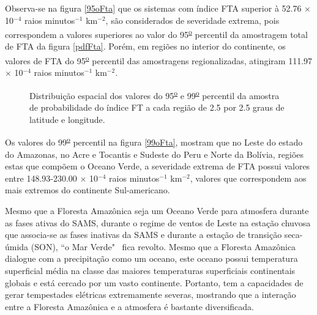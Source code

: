
Observa-se na figura \ref{95oFta} que os sistemas com índice FTA  superior à 52.76 $\times$ 10$^{-4}$ raios minutos$^{-1}$
km$^{-2}$, são considerados de severidade extrema, pois correspondem a valores superiores ao valor do 95\textsuperscript{\underline{o}} percentil da amostragem total de FTA da figura \ref{pdfFta}. Porém, em regiões no interior do continente, os valores de FTA do 95\textsuperscript{\underline{o}} percentil das amostragens regionalizadas, atingiram  111.97 $\times$ 10$^{-4}$ raios minutos$^{-1}$ km$^{-2}$.



\begin{figure}[!ht]
  \caption{Distribuição espacial dos valores do 95\textsuperscript{\underline{o}} e 99\textsuperscript{\underline{o}} percentil da amostra de probabilidade do índice FT a cada região de 2.5 por 2.5 graus de latitude e longitude.}
\label{extremosSupFTA}
\end{figure} 

Os valores do 99\textsuperscript{\underline{o}} percentil na figura \ref{99oFta}, mostram que no Leste do estado do Amazonas, no Acre e Tocantis e Sudeste do Peru e Norte da Bolívia, regiões estas que compõem o Oceano Verde, a severidade extrema de FTA possui valores entre 148.93-230.00  $\times$ 10$^{-4}$ raios minutos$^{-1}$ km$^{-2}$,  valores que correspondem aos mais extremos do continente Sul-americano. 

Mesmo que a Floresta Amazônica seja um Oceano Verde para atmosfera durante as fases ativas do SAMS, durante o regime de ventos de Leste na estação chuvosa que associa-se as fases inativas da SAMS e durante a estação de transição seca-úmida (SON), ``o Mar Verde"  ~fica revolto. Mesmo que a Floresta Amazônica dialogue com a precipitação como um oceano, este oceano possui temperatura superficial média na classe das maiores temperaturas superficiais continentais globais e está cercado por um vasto continente. Portanto, tem a capacidades de gerar tempestades elétricas extremamente severas, mostrando que a interação entre a Floresta Amazônica e a atmosfera é bastante diversificada.

